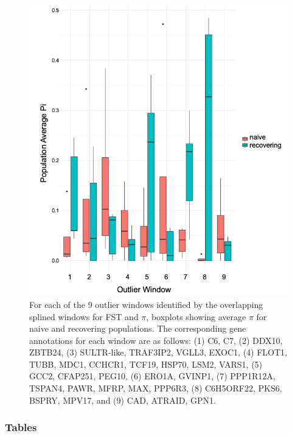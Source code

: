 \documentclass[
  letterpaper,
  DIV=11,
  numbers=noendperiod]{scrartcl}
\begin{document}
\begin{figure}

{\centering \includegraphics[width=5.20833in,height=\textheight]{figures/boxplot_pi_by_windowpop.png}

}

\caption{\label{fig-boxplot-pi-by-windowpop}For each of the 9 outlier
windows identified by the overlapping splined windows for FST and
\(\pi\), boxplots showing average \(\pi\) for naive and recovering
populations. The corresponding gene annotations for each window are as
follows: (1) C6, C7, (2) DDX10, ZBTB24, (3) SULTR-like, TRAF3IP2, VGLL3,
EXOC1, (4) FLOT1, TUBB, MDC1, CCHCR1, TCF19, HSP70, LSM2, VARS1, (5)
GCC2, CFAP251, PEG10, (6) ERO1A, GVINP1, (7) PPP1R12A, TSPAN4, PAWR,
MFRP, MAX, PPP6R3, (8) C6H5ORF22, PKS6, BSPRY, MPV17, and (9) CAD,
ATRAID, GPN1.}

\end{figure}

\newpage

\hypertarget{tables}{%
\subsubsection{Tables}\label{tables}}
\end{document}
